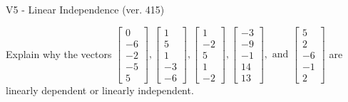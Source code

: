 \begin{exercise}
  \begin{exerciseTitle}V5 - Linear Independence (ver. 415)\end{exerciseTitle}
  \begin{exerciseStatement}
    Explain why the vectors \(\left[\begin{array}{r}
0 \\
-6 \\
-2 \\
-5 \\
5
\end{array}\right] , \left[\begin{array}{r}
1 \\
5 \\
1 \\
-3 \\
-6
\end{array}\right] , \left[\begin{array}{r}
1 \\
-2 \\
5 \\
1 \\
-2
\end{array}\right] , \left[\begin{array}{r}
-3 \\
-9 \\
-1 \\
14 \\
13
\end{array}\right] , \text{ and } \left[\begin{array}{r}
5 \\
2 \\
-6 \\
-1 \\
2
\end{array}\right]\) are linearly dependent or linearly independent.	



\end{exerciseStatement}
\end{exercise}
